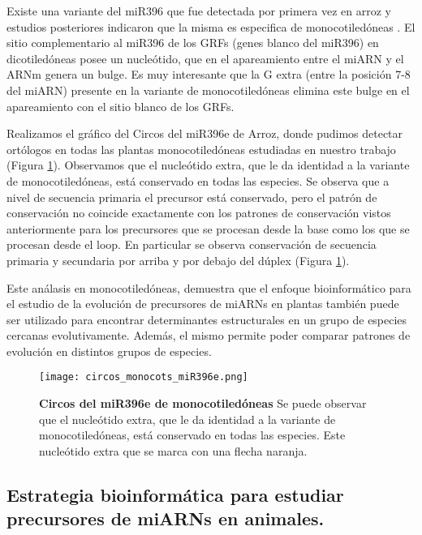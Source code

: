Existe una variante del miR396 que fue detectada por primera vez en arroz \citep{pmid15805478} y estudios posteriores indicaron que la misma es especifica de monocotiledóneas \citep{pmid18416839, pmid19936050}.
El sitio complementario al miR396 de los GRFs (genes blanco del miR396) en dicotiledóneas posee un nucleótido, que en el apareamiento entre el miARN y el ARNm genera un bulge.
Es muy interesante que la G extra (entre la posición 7-8 del miARN) presente en la variante de monocotiledóneas elimina este bulge en el apareamiento con el sitio blanco de los GRFs.

Realizamos el gráfico del Circos del miR396e de Arroz, donde pudimos detectar ortólogos en todas las plantas monocotiledóneas estudiadas en nuestro trabajo (Figura \ref{fig:circos_monocots_miR396e}).
Observamos que el nucleótido extra, que le da identidad a la variante de monocotiledóneas, está conservado en todas las especies.
Se observa que a nivel de secuencia primaria el precursor está conservado, pero el patrón de conservación no coincide exactamente con los patrones de conservación vistos anteriormente para los precursores que se procesan desde la base como los que se procesan desde el loop.
En particular se observa conservación de secuencia primaria y secundaria por arriba y por debajo del dúplex (Figura \ref{fig:circos_monocots_miR396e}).

Este análasis en monocotiledóneas, demuestra que el enfoque bioinformático para el estudio de la evolución de precursores de miARNs en plantas también puede ser utilizado para encontrar determinantes estructurales en un grupo de especies cercanas evolutivamente.  
Además, el mismo permite poder comparar patrones de evolución en distintos grupos de especies.

\begin{figure}[htbp!] 
    \centering    
    \texttt{[image: circos\_monocots\_miR396e.png]}
    \caption[Circos del miR172a]{
    \textbf{Circos del miR396e de monocotiledóneas}
    Se puede observar que el nucleótido extra, que le da identidad a la variante de monocotiledóneas, está conservado en todas las especies.
    Este nucleótido extra que se marca con una flecha naranja.
    }
     \label{fig:circos_monocots_miR396e}
\end{figure}

\subsection{Estrategia bioinformática para estudiar precursores de miARNs en animales.}

